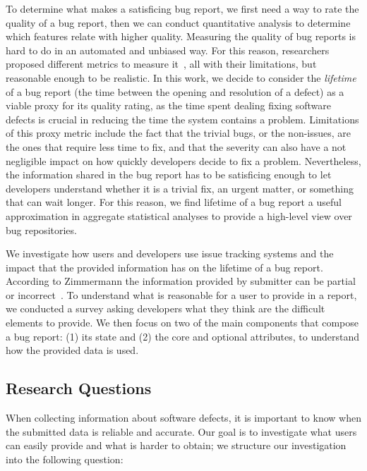 To determine what makes a satisficing bug report, we first need a way to rate the quality of a bug report, then we can conduct quantitative analysis to determine which features relate with higher quality.
Measuring the quality of bug reports is hard to do in an automated and unbiased way.
For this reason, researchers proposed different metrics to measure it~\cite{Hooi2007}, all with their limitations, but reasonable enough to be realistic.
In this work, we decide to consider the \emph{lifetime} of a bug report (\ie the time between the opening and resolution of a defect) as a viable proxy for its quality rating, as the time spent dealing fixing software defects is crucial in reducing the time the system contains a problem.
Limitations of this proxy metric include the fact that the trivial bugs, or the non-issues, are the ones that require less time to fix, and that the severity can also have a not negligible impact on how quickly developers decide to fix a problem.
Nevertheless, the information shared in the bug report has to be satisficing enough to let developers understand whether it is a trivial fix, an urgent matter, or something that can wait longer.
For this reason, we find lifetime of a bug report a useful approximation in aggregate statistical analyses to provide a high-level view over bug repositories.

We investigate how users and developers use issue tracking systems and the impact that the provided information has on the lifetime of a bug report.
According to Zimmermann \etal the information provided by submitter can be partial or incorrect~\cite{Zimm2010a}.
To understand what is reasonable for a user to provide in a report, we conducted a survey asking developers what they think are the difficult elements to provide.
We then focus on two of the main components that compose a bug report: (1) its state and (2) the core and optional attributes, to understand how the provided data is used.

\subsection{Research Questions}\label{sec:model-questions}

When collecting information about software defects, it is important to know when the submitted data is reliable and accurate.
Our goal is to investigate what  users can easily provide and what is harder to obtain; we structure our investigation into the following question:


